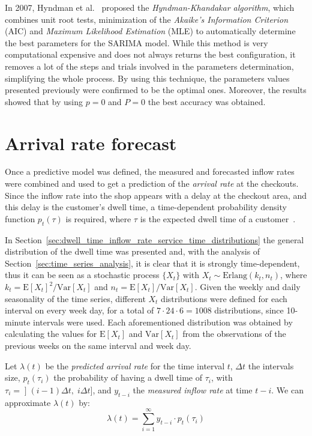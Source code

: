 In 2007, Hyndman et al.~\cite{hyndman2007} proposed the \emph{Hyndman-Khandakar algorithm}, which combines unit root tests, minimization of the \emph{Akaike’s Information Criterion} (AIC) and \emph{Maximum Likelihood Estimation} (MLE) to automatically determine the best parameters for the SARIMA model. While this method is very computational expensive and does not always returns the best configuration, it removes a lot of the steps and trials involved in the parameters determination, simplifying the whole process. By using this technique, the parameters values presented previously were confirmed to be the optimal ones. Moreover, the results showed that by using \( p = 0 \) and \( P = 0 \) the best accuracy was obtained.

\section{Arrival rate forecast}
\label{sec:arrival_rate_forecast}

Once a predictive model was defined, the measured and forecasted inflow rates were combined and used to get a prediction of the \emph{arrival rate} at the checkouts. Since the inflow rate into the shop appears with a delay at the checkout area, and this delay is the customer's dwell time, a time-dependent probability density function \( p_t(\tau) \) is required, where \( \tau \) is the expected dwell time of a customer~\cite{aksu}.

In Section~\ref{sec:dwell_time_inflow_rate_service_time_distributions} the general distribution of the dwell time was presented and, with the analysis of Section~\ref{sec:time_series_analysis}, it is clear that it is strongly time-dependent, thus it can be seen as a stochastic process \( \{ X_t \} \) with \( X_t \sim \text{Erlang}(k_t, n_t) \), where \( k_t = \text{E}[X_t]^2 / \text{Var}[X_t] \) and \( n_t =  \text{E}[X_t] / \text{Var}[X_t] \). Given the weekly and daily seasonality of the time series, different \( X_t \) distributions were defined for each interval on every week day, for a total of \( 7 \cdot 24 \cdot 6 = 1008 \) distributions, since 10-minute intervals were used. Each aforementioned distribution was obtained by calculating the values for \( \text{E}[X_t] \) and \( \text{Var}[X_t] \) from the observations of the previous weeks on the same interval and week day.

Let \( \lambda(t) \) be the \emph{predicted arrival rate} for the time interval \( t \), \( \Delta t \) the intervals size, \( p_t(\tau_i) \) the probability of having a dwell time of \( \tau_i \), with \( \tau_i = \mathopen] (i-1) \Delta t, \; i \Delta t \mathclose] \), and \( y_{t-i} \) the \emph{measured inflow rate} at time \( t-i \). We can approximate \( \lambda(t) \) by:
\begin{equation}
  \lambda(t) = \sum_{i=1}^{\infty} y_{t-i} \cdot p_t(\tau_i)
\end{equation}

